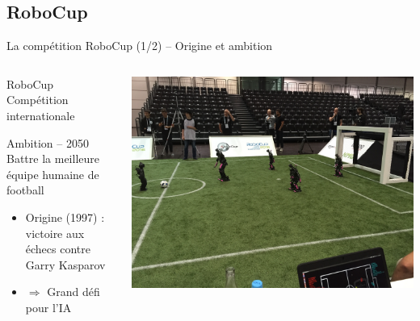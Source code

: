 
\subsection{RoboCup}

\begin{frame}{La compétition RoboCup (1/2) -- Origine et ambition}
    \begin{columns}
        \begin{column}{0.45\linewidth}
            \begin{block}{RoboCup}
                Compétition internationale
            \end{block}
            \begin{block}{Ambition -- 2050}
                Battre la meilleure équipe humaine de football
            \end{block}
            \vspace{1.0em}
            \begin{itemize}
                \setlength\itemsep{1.0em}
                \item Origine (1997) : victoire
                    aux échecs contre Garry Kasparov
                \item $\Rightarrow$ Grand défi pour l'IA
            \end{itemize}
        \end{column}
        \begin{column}{0.55\linewidth}
            \centering
            \includegraphics[width=1.0\linewidth]{../media/robocup_field.jpg}
        \end{column}
    \end{columns}
\end{frame}

